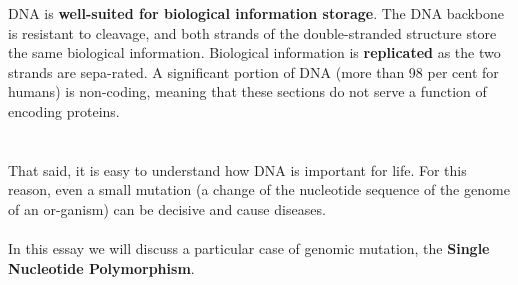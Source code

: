 DNA is \textbf{well-suited for biological information storage}. The DNA backbone is resistant to cleavage, and both strands of the double-stranded structure store the same biological information. Biological information is \textbf{replicated} as the two strands are sepa-rated. A significant portion of DNA (more than 98 per cent for humans) is non-coding, meaning that these sections do not serve a function of encoding proteins.
\\
\\
\\That said, it is easy to understand how DNA is important for life. For this reason, even a small mutation (a change of the nucleotide sequence of the genome of an or-ganism) can be decisive and cause diseases.
\\
\\In this essay we will discuss a particular case of genomic mutation, the \textbf{Single Nucleotide Polymorphism}.